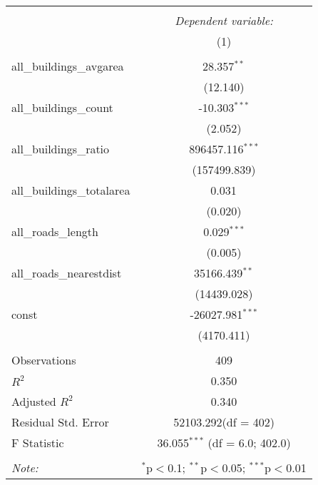 \begin{table}[!htbp] \centering
\begin{tabular}{@{\extracolsep{5pt}}lc}
\\[-1.8ex]\hline
\hline \\[-1.8ex]
& \multicolumn{1}{c}{\textit{Dependent variable:}} \
\cr \cline{1-2}
\\[-1.8ex] & (1) \\
\hline \\[-1.8ex]
 all_buildings_avgarea & 28.357$^{**}$ \\
  & (12.140) \\
 all_buildings_count & -10.303$^{***}$ \\
  & (2.052) \\
 all_buildings_ratio & 896457.116$^{***}$ \\
  & (157499.839) \\
 all_buildings_totalarea & 0.031$^{}$ \\
  & (0.020) \\
 all_roads_length & 0.029$^{***}$ \\
  & (0.005) \\
 all_roads_nearestdist & 35166.439$^{**}$ \\
  & (14439.028) \\
 const & -26027.981$^{***}$ \\
  & (4170.411) \\
\hline \\[-1.8ex]
 Observations & 409 \\
 $R^2$ & 0.350 \\
 Adjusted $R^2$ & 0.340 \\
 Residual Std. Error & 52103.292(df = 402)  \\
 F Statistic & 36.055$^{***}$ (df = 6.0; 402.0) \\
\hline
\hline \\[-1.8ex]
\textit{Note:} & \multicolumn{1}{r}{$^{*}$p$<$0.1; $^{**}$p$<$0.05; $^{***}$p$<$0.01} \\
\end{tabular}
\end{table}